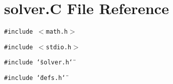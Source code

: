 \section{solver.C File Reference}
\label{solver_8C}
{\tt \#include $<$math.h$>$}\par
{\tt \#include $<$stdio.h$>$}\par
{\tt \#include \char`\"{}solver.h\char`\"{}}\par
{\tt \#include \char`\"{}defs.h\char`\"{}}\par
